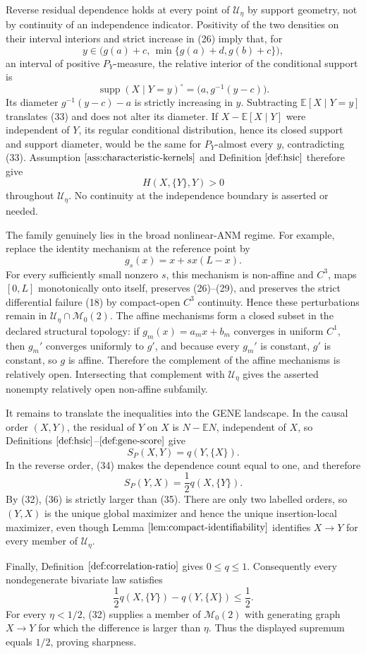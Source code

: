 Reverse residual dependence holds at every point of \(\mathcal U_\eta\) by support geometry, not by continuity of an independence indicator.  Positivity of the two densities on their interval interiors and strict increase in (26) imply that, for
\[
 y\in\bigl(g(a)+c,\,\min\{g(a)+d,g(b)+c\}\bigr),
\]
an interval of positive \(P_Y\)-measure, the relative interior of the conditional support is
\[
 \operatorname{supp}(X\mid Y=y)^\circ
 =\bigl(a,g^{-1}(y-c)\bigr). \tag{33}
\]
Its diameter \(g^{-1}(y-c)-a\) is strictly increasing in \(y\).  Subtracting \(\mathbb E[X\mid Y=y]\) translates (33) and does not alter its diameter.  If \(X-\mathbb E[X\mid Y]\) were independent of \(Y\), its regular conditional distribution, hence its closed support and support diameter, would be the same for \(P_Y\)-almost every \(y\), contradicting (33).  Assumption \(\ref{ass:characteristic-kernels}\) and Definition \(\ref{def:hsic}\) therefore give
\[
 H(X,\{Y\},Y)>0 \tag{34}
\]
throughout \(\mathcal U_\eta\).  No continuity at the independence boundary is asserted or needed.

The family genuinely lies in the broad nonlinear-ANM regime.  For example, replace the identity mechanism at the reference point by
\[
 g_s(x)=x+s x(L-x).
\]
For every sufficiently small nonzero \(s\), this mechanism is non-affine and \(C^3\), maps \([0,L]\) monotonically onto itself, preserves (26)--(29), and preserves the strict differential failure (18) by compact-open \(C^3\) continuity.  Hence these perturbations remain in \(\mathcal U_\eta\cap\mathcal M_0(2)\).  The affine mechanisms form a closed subset in the declared structural topology: if \(g_m(x)=a_mx+b_m\) converges in uniform \(C^1\), then \(g_m'\) converges uniformly to \(g'\), and because every \(g_m'\) is constant, \(g'\) is constant, so \(g\) is affine.  Therefore the complement of the affine mechanisms is relatively open.  Intersecting that complement with \(\mathcal U_\eta\) gives the asserted nonempty relatively open non-affine subfamily.

It remains to translate the inequalities into the GENE landscape.  In the causal order \((X,Y)\), the residual of \(Y\) on \(X\) is \(N-\mathbb EN\), independent of \(X\), so Definitions \(\ref{def:hsic}\)--\(\ref{def:gene-score}\) give
\[
 S_P(X,Y)=q(Y,\{X\}). \tag{35}
\]
In the reverse order, (34) makes the dependence count equal to one, and therefore
\[
 S_P(Y,X)=\frac12q(X,\{Y\}). \tag{36}
\]
By (32), (36) is strictly larger than (35).  There are only two labelled orders, so \((Y,X)\) is the unique global maximizer and hence the unique insertion-local maximizer, even though Lemma \(\ref{lem:compact-identifiability}\) identifies \(X\to Y\) for every member of \(\mathcal U_\eta\).

Finally, Definition \(\ref{def:correlation-ratio}\) gives \(0\le q\le1\).  Consequently every nondegenerate bivariate law satisfies
\[
 \frac12q(X,\{Y\})-q(Y,\{X\})\le\frac12. \tag{37}
\]
For every \(\eta<1/2\), (32) supplies a member of \(\mathcal M_0(2)\) with generating graph \(X\to Y\) for which the difference is larger than \(\eta\).  Thus the displayed supremum equals \(1/2\), proving sharpness.
